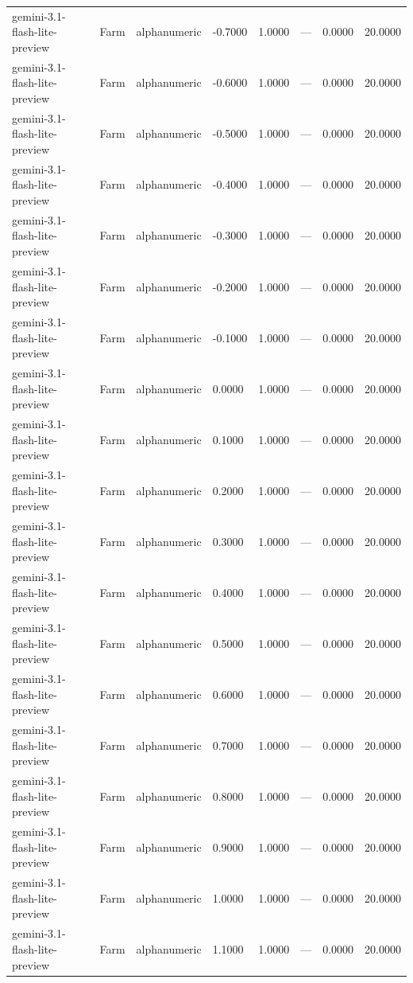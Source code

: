 \begin{table}
\begin{tabular}{llllrrrr}
gemini-3.1-flash-lite-preview & Farm & alphanumeric & -0.7000 & 1.0000 & --- & 0.0000 & 20.0000 \\
gemini-3.1-flash-lite-preview & Farm & alphanumeric & -0.6000 & 1.0000 & --- & 0.0000 & 20.0000 \\
gemini-3.1-flash-lite-preview & Farm & alphanumeric & -0.5000 & 1.0000 & --- & 0.0000 & 20.0000 \\
gemini-3.1-flash-lite-preview & Farm & alphanumeric & -0.4000 & 1.0000 & --- & 0.0000 & 20.0000 \\
gemini-3.1-flash-lite-preview & Farm & alphanumeric & -0.3000 & 1.0000 & --- & 0.0000 & 20.0000 \\
gemini-3.1-flash-lite-preview & Farm & alphanumeric & -0.2000 & 1.0000 & --- & 0.0000 & 20.0000 \\
gemini-3.1-flash-lite-preview & Farm & alphanumeric & -0.1000 & 1.0000 & --- & 0.0000 & 20.0000 \\
gemini-3.1-flash-lite-preview & Farm & alphanumeric & 0.0000 & 1.0000 & --- & 0.0000 & 20.0000 \\
gemini-3.1-flash-lite-preview & Farm & alphanumeric & 0.1000 & 1.0000 & --- & 0.0000 & 20.0000 \\
gemini-3.1-flash-lite-preview & Farm & alphanumeric & 0.2000 & 1.0000 & --- & 0.0000 & 20.0000 \\
gemini-3.1-flash-lite-preview & Farm & alphanumeric & 0.3000 & 1.0000 & --- & 0.0000 & 20.0000 \\
gemini-3.1-flash-lite-preview & Farm & alphanumeric & 0.4000 & 1.0000 & --- & 0.0000 & 20.0000 \\
gemini-3.1-flash-lite-preview & Farm & alphanumeric & 0.5000 & 1.0000 & --- & 0.0000 & 20.0000 \\
gemini-3.1-flash-lite-preview & Farm & alphanumeric & 0.6000 & 1.0000 & --- & 0.0000 & 20.0000 \\
gemini-3.1-flash-lite-preview & Farm & alphanumeric & 0.7000 & 1.0000 & --- & 0.0000 & 20.0000 \\
gemini-3.1-flash-lite-preview & Farm & alphanumeric & 0.8000 & 1.0000 & --- & 0.0000 & 20.0000 \\
gemini-3.1-flash-lite-preview & Farm & alphanumeric & 0.9000 & 1.0000 & --- & 0.0000 & 20.0000 \\
gemini-3.1-flash-lite-preview & Farm & alphanumeric & 1.0000 & 1.0000 & --- & 0.0000 & 20.0000 \\
gemini-3.1-flash-lite-preview & Farm & alphanumeric & 1.1000 & 1.0000 & --- & 0.0000 & 20.0000 \\

\end{tabular}
\end{table}
